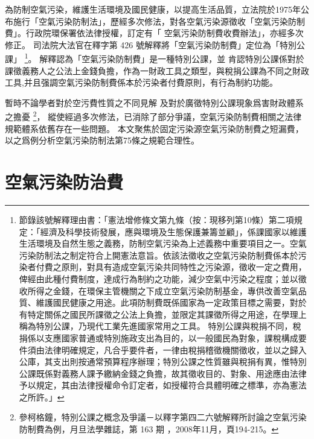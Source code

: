 為防制空氣污染，維護生活環境及國民健康，以提高生活品質，立法院於1975年公布施行「空氣污染防制法」，歷經多次修法，對各空氣污染源徵收「空氣污染防制費」。行政院環保署依法律授權，訂定有「	空氣污染防制費收費辦法」，亦經多次修正。
司法院大法官在釋字第 426 號解釋將「空氣污染防制費」定位為「特別公課」
\footnote{節錄該號解釋理由書：「憲法增修條文第九條（按：現移列第10條）第二項規定：「經濟及科學技術發展，應與環境及生態保護兼籌並顧」，係課國家以維護生活環境及自然生態之義務，防制空氣污染為上述義務中重要項目之一。空氣污染防制法之制定符合上開憲法意旨。依該法徵收之空氣污染防制費係本於污染者付費之原則，對具有造成空氣污染共同特性之污染源，徵收一定之費用，俾經由此種付費制度，達成行為制約之功能，減少空氣中污染之程度；並以徵收所得之金錢，在環保主管機關之下成立空氣污染防制基金，專供改善空氣品質、維護國民健康之用途。此項防制費既係國家為一定政策目標之需要，對於有特定關係之國民所課徵之公法上負擔，並限定其課徵所得之用途，在學理上稱為特別公課，乃現代工業先進國家常用之工具。
特別公課與稅捐不同，稅捐係以支應國家普通或特別施政支出為目的，以一般國民為對象，課稅構成要件須由法律明確規定，凡合乎要件者，一律由稅捐稽徵機關徵收，並以之歸入公庫，其支出則按通常預算程序辦理；特別公課之性質雖與稅捐有異，惟特別公課既係對義務人課予繳納金錢之負擔，故其徵收目的、對象、用途應由法律予以規定，其由法律授權命令訂定者，如授權符合具體明確之標準，亦為憲法之所許。」}。
解釋認為「空氣污染防制費」是一種特別公課，並
肯認特別公課係對於課徵義務人之公法上金錢負擔，作為一財政工具之類型，與稅捐公課為不同之財政工具,并且强調空氣污染防制費係本於污染者付費原則，有行為制約功能。


暫時不論學者對於空污費性質之不同見解
及對於廣徵特別公課現象爲害財政體系之擔憂
\footnote{參柯格鐘，特別公課之概念及爭議－以釋字第四二六號解釋所討論之空氣污染防制費為例，月旦法學雜誌，第 163 期 ，2008年11月，頁194-215。}，
縱使經過多次修法，已消除了部分爭議，空氣污染防制費相關之法律規範體系依舊存在一些問題。
本文聚焦於固定污染源空氣污染防制費之短漏費，以之爲例分析空氣污染防制法第75條之規範合理性。


\section{空氣污染防治費}

